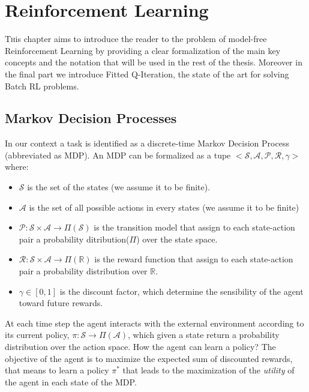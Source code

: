 \chapter{Reinforcement Learning}

\lettrine[lines=2]{T}his chapter aims to introduce the reader to the problem of model-free Reinforcement Learning
by providing a clear formalization of the main key concepts and the notation that
will be used in the rest of the thesis. Moreover in the final part we introduce Fitted Q-Iteration, the
state of the art for solving Batch RL problems.

\section{Markov Decision Processes}
	\noindent In our context a task is identified as a discrete-time Markov Decision Process (abbreviated as MDP).\newline
	An MDP can be formalized as a tupe $<\mathcal{S},\mathcal{A},\mathcal{P},\mathcal{R},\gamma>$ where:

	\begin{itemize}
		\item $\mathcal{S}$ is the set of the states (we assume it to be finite).
		\item $\mathcal{A}$ is the set of all possible actions in every states (we assume it to be finite)
		\item $\mathcal{P} \mathcal{: S} \times \mathcal{A} \rightarrow \Pi(\mathcal{S})$ is the transition model that
					assign to each state-action pair a probability ditribution($\Pi$) over the state space.
		\item $\mathcal{R} \mathcal{: S} \times \mathcal{A} \rightarrow \Pi(\mathbb{R})$ is the reward function that
					assign to each state-action pair a probability distribution over $\mathbb{R}$.
		\item $\gamma \in [0,1]$ is the discount factor, which determine the sensibility of the agent toward future rewards.
	\end{itemize}

	\noindent At each time step the agent interacts with the external environment according to
	its current policy, $\pi \mathcal{: S} \rightarrow \Pi(\mathcal{A})$, which given
	a state return a probability distribution over the action space.\newline
	How the agent can learn a policy? The objective of the agent is to maximize the
	expected sum of discounted rewards, that means to learn a policy $\pi^*$
	that leads to the maximization of the \textit{utility} of the agent in each state of the MDP.\newline

